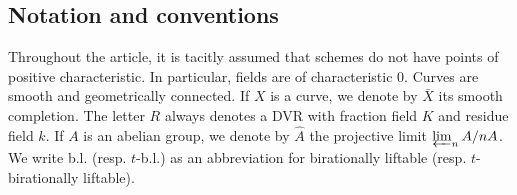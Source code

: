 \documentclass[11pt]{amsart}
\theoremstyle{plain}
\theoremstyle{definition}
\newcommand{\on}{\operatorname}
\newcommand{\1}{\mathbb{1}}
\newcommand{\spec}{\on{Spec}}
\renewcommand{\projlim}{\varprojlim}
\renewcommand{\hat}{\widehat}
\begin{document}
\subsection*{Notation and conventions}

Throughout the article, it is tacitly assumed that schemes do not have points of positive characteristic. In particular, fields are of characteristic $0$. Curves are smooth and geometrically connected. If $X$ is a curve, we denote by $\bar{X}$ its smooth completion. The letter $R$ always denotes a DVR with fraction field $K$ and residue field $k$. If $A$ is an abelian group, we denote by $\hat{A}$ the projective limit $\projlim_{n}A/nA$. We write b.l. (resp. $t$-b.l.) as an abbreviation for birationally liftable (resp. $t$-birationally liftable).








\end{document}
